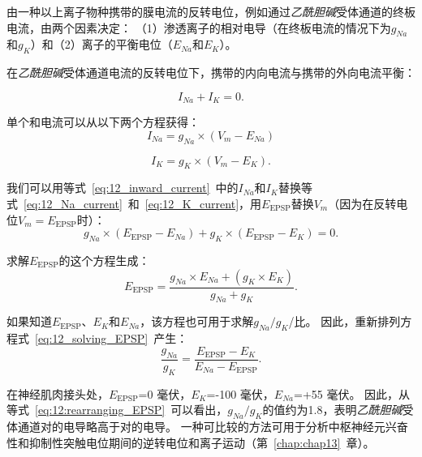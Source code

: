\begin{proposition}[端板电位的反转电位] \label{box:12_1}
	
	\quad \quad 由一种以上离子物种携带的膜电流的反转电位，例如通过\textit{乙酰胆碱}受体通道的终板电流，由两个因素决定：
	（1）渗透离子的相对电导（在终板电流的情况下为$g_{Na}$和$g_K$）和（2）离子的平衡电位（$E_{Na}$和$E_K$）。
	
	\quad \quad 在\textit{乙酰胆碱}受体通道电流的反转电位下，携带的内向电流与携带的外向电流平衡：
	
	\begin{equation}\label{eq:12_inward_current}
		I_{Na} + I_K = 0.
	\end{equation}
	
	\quad \quad 单个和电流可以从以下两个方程获得：
	\begin{equation}\label{eq:12_Na_current}
		I_{Na} = g_{Na} \times (V_m - E_{Na})
	\end{equation}

	\begin{equation}\label{eq:12_K_current}
		I_K = g_K \times (V_m - E_K).
	\end{equation}
	
	\quad \quad 我们可以用等式~\ref{eq:12_inward_current}~中的$ I_{Na} $和$ I_K $替换等式~\ref{eq:12_Na_current}~和~\ref{eq:12_K_current}，用$E_{\text{EPSP}}$替换$V_m$（因为在反转电位$V_m = E_{\text{EPSP}}$时）：
	\begin{equation}\label{eq:12_substitude_inward_current}
		g_{Na} \times (E_{\text{EPSP}} - E_{Na}) + 
		g_K \times (E_{\text{EPSP}} - E_K)
		= 0.
	\end{equation}
	
	\quad \quad 求解$ E_{\text{EPSP}} $的这个方程生成：
	\begin{equation}\label{eq:12_solving_EPSP}
		E_{\text{EPSP}} = 
			\frac{
				g_{Na} \times E_{Na} + (g_K \times E_K)
			}
			{
				g_{Na} + g_K
			}.
	\end{equation}
	
	\quad \quad 如果知道$E_{\text{EPSP}}$、$E_K$和$E_{Na}$，该方程也可用于求解$g_{Na} / g_K$/比。
	因此，重新排列方程式~\ref{eq:12_solving_EPSP}~产生：
	\begin{equation}\label{eq:12:rearranging_EPSP}
		\frac{g_{Na}}{g_K} = 
		\frac{E_{\text{EPSP}} - E_{K}}{E_{Na} - E_{\text{EPSP}}}.
	\end{equation}
	
	\quad \quad 在神经肌肉接头处，$E_{\text{EPSP}}$=0 毫伏，$E_K$=-100 毫伏，$E_{Na}$=+55 毫伏。
	因此，从等式~\ref{eq:12:rearranging_EPSP}~可以看出，$g_{Na} / g_K$的值约为1.8，表明\textit{乙酰胆碱}受体通道对的电导略高于对的电导。
	一种可比较的方法可用于分析中枢神经元兴奋性和抑制性突触电位期间的逆转电位和离子运动（第~\ref{chap:chap13}~章）。
	
\end{proposition}



